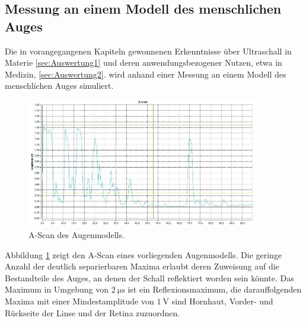 \subsection{Messung an einem Modell des menschlichen Auges}
\label{sec:Auswertung3}
Die in vorangegangenen Kapiteln gewonnenen Erkenntnisse über Ultraschall in Materie \ref{sec:Auswertung1} und deren anwendungsbezogener Nutzen, etwa in Medizin, \ref{sec:Auswertung2}. wird anhand einer  Messung an einem Modell des menschlichen Auges simuliert.
\begin{figure}[h]
	\centering
	\includegraphics[width=0.9\textwidth]{Bilder/Auge.jpg}
	\caption{A-Scan des Augenmodells.}
	\label{fig:eye_scan}
\end{figure}
Abbildung \ref{fig:eye_scan} zeigt den A-Scan eines vorliegenden Augenmodells.
Die geringe Anzahl der deutlich separierbaren Maxima erlaubt deren Zuweisung auf die Bestandteile des Auges, an denen der Schall reflektiert worden sein könnte. 
Das Maximum in Umgebung von $\SI{2}{\micro\second}$ ist ein Reflexionsmaximum, die darauffolgenden Maxima mit einer Mindestamplitude von $\SI{1}{\volt}$ sind Hornhaut, Vorder- und Rückseite der Linse und der Retina zuzuordnen.

